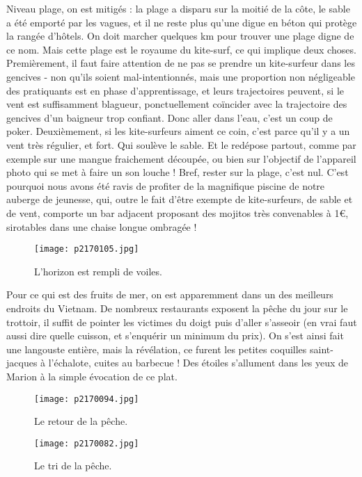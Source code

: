 \documentclass{book}
\begin{document}
Niveau plage, on est mitigés : la plage a disparu sur la moitié de la côte, le sable a été emporté par les vagues, et il ne reste plus qu'une digue en béton qui protège la rangée d'hôtels. On doit marcher quelques km pour trouver une plage digne de ce nom. Mais cette plage est le royaume du kite-surf, ce qui implique deux choses. Premièrement, il faut faire attention de ne pas se prendre un kite-surfeur dans les gencives - non qu'ils soient mal-intentionnés, mais une proportion non négligeable des pratiquants est en phase d'apprentissage, et leurs trajectoires peuvent, si le vent est suffisamment blagueur, ponctuellement coïncider avec la trajectoire des gencives d'un baigneur trop confiant. Donc aller dans l'eau, c'est un coup de poker. Deuxièmement, si les kite-surfeurs aiment ce coin, c'est parce qu'il y a un vent très régulier, et fort. Qui soulève le sable. Et le redépose partout, comme par exemple sur une mangue fraichement découpée, ou bien sur l'objectif de l'appareil photo qui se met à faire un son louche ! Bref, rester sur la plage, c'est nul. C'est pourquoi nous avons été ravis de profiter de la magnifique piscine de notre auberge de jeunesse, qui, outre le fait d'être exempte de kite-surfeurs, de sable et de vent, comporte un bar adjacent proposant des mojitos très convenables à 1\euro, sirotables dans une chaise longue ombragée !


\begin{figure}[h]
\centering
\texttt{[image: p2170105.jpg]}
\caption*{L'horizon est rempli de voiles.}
\end{figure}

Pour ce qui est des fruits de mer, on est apparemment dans un des meilleurs endroits du Vietnam. De nombreux restaurants exposent la pêche du jour sur le trottoir, il suffit de pointer les victimes du doigt puis d'aller s'asseoir (en vrai faut aussi dire quelle cuisson, et s'enquérir un minimum du prix). On s'est ainsi fait une langouste entière, mais la révélation, ce furent les petites coquilles saint-jacques à l'échalote, cuites au barbecue ! Des étoiles s'allument dans les yeux de Marion à la simple évocation de ce plat.


\begin{figure}[h]
\centering
\texttt{[image: p2170094.jpg]}
\caption*{Le retour de la pêche.}
\end{figure}


\begin{figure}[h]
\centering
\texttt{[image: p2170082.jpg]}
\caption*{Le tri de la pêche.}
\end{figure}
\end{document}

